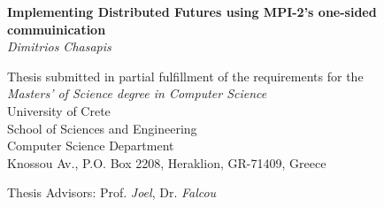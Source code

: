 \begin{titlepage}
\begin{center}

\LARGE \textbf{Implementing Distributed Futures using MPI-2's one-sided commuinication}\\[0.5cm]
\LARGE \textit{Dimitrios Chasapis}\\[0.5cm]

\vfill

\normalsize{
Thesis submitted in partial fulfillment of the requirements for the\\[0.30cm]

\textit{Masters' of Science degree in Computer Science}}\\[0.30cm]

University of Crete\\
School of Sciences and Engineering\\
Computer Science Department\\
Knossou Av., P.O. Box 2208, Heraklion, GR-71409, Greece\\[0.5cm]

\vfill

\Large{Thesis Advisors: Prof. \emph{Joel}, Dr. \emph{Falcou}}\\[0.5cm]

\vfill

\end{center}

\worksupportedby{}
\end{titlepage}
